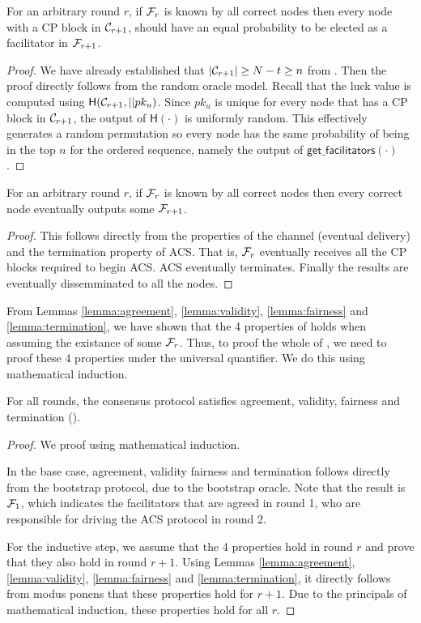 \begin{lemma}
\label{lemma:fairness}
For an arbitrary round $r$,
if $\mathcal{F}_r$ is known by all correct nodes then
every node with a CP block in $\mathcal{C}_{r+1}$, should have an equal probability to be elected as a facilitator in $\mathcal{F}_{r+1}$.
\end{lemma}
\begin{proof}
We have already established that $|\mathcal{C}_{r+1}| \ge N - t \ge n$ from .
Then the proof directly follows from the random oracle model.
Recall that the luck value is computed using $\textsf{H}(\mathcal{C}_{r+1}, || pk_u)$.
Since $pk_u$ is unique for every node that has a CP block in $\mathcal{C}_{r+1}$,
the output of $\textsf{H}(\cdot)$ is uniformly random.
This effectively generates a random permutation
so every node has the same probability of being in the top $n$ for the ordered sequence,
namely the output of $\textsf{get\_facilitators}(\cdot)$.
\end{proof}

\begin{lemma}
\label{lemma:termination}
For an arbitrary round $r$,
if $\mathcal{F}_r$ is known by all correct nodes then
every correct node eventually outputs some $\mathcal{F}_{r + 1}$.
\end{lemma}
\begin{proof}
This follows directly from the properties of the channel (eventual delivery)
and the termination property of ACS.
That is, $\mathcal{F}_r$ eventually receives all the CP blocks required to begin ACS.
ACS eventually terminates.
Finally the results are eventually dissemminated to all the nodes.
\end{proof}

From Lemmas \ref{lemma:agreement}, \ref{lemma:validity}, \ref{lemma:fairness} and \ref{lemma:termination},
we have shown that the 4 properties of  holds when assuming the existance of some $\mathcal{F}_r$.
Thus, to proof the whole of ,
we need to proof these 4 properties under the universal quantifier.
We do this using mathematical induction.

\begin{theorem}
\label{theorem:consensus}
For all rounds,
the consensus protocol satisfies agreement, validity, fairness and termination ().
\end{theorem}
\begin{proof}
We proof using mathematical induction.

In the base case, agreement, validity fairness and termination follows directly from the bootstrap protocol,
due to the bootstrap oracle.
Note that the result is $\mathcal{F}_1$, which indicates the facilitators that are agreed in round 1, who are responsible for driving the ACS protocol in round 2.

For the inductive step,
we assume that the 4 properties hold in round $r$ and prove that they also hold in round $r + 1$.
Using Lemmas \ref{lemma:agreement}, \ref{lemma:validity}, \ref{lemma:fairness} and \ref{lemma:termination},
it directly follows from modus ponens that these properties hold for $r + 1$.
Due to the principals of mathematical induction, these properties hold for all $r$.
\end{proof}

